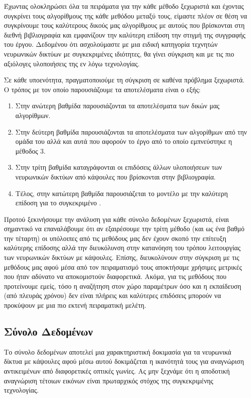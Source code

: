 Έχωντας ολοκληρώσει όλα τα πειράματα για την κάθε μέθοδο ξεχωριστά και έχοντας συγκρίνει τους αλγορίθμους της κάθε μεθόδου μεταξύ τους, είμαστε πλέον σε θέση να συγκρίνουμε τους καλύτερους δικούς μας αλγορίθμους με αυτούς που βρίσκονται στη διεθνή βιβλιογραφία και εμφανίζουν την καλύτερη επίδοση την στιγμή της συγγραφής του έργου. Δεδομένου ότι ασχολούμαστε με μια ειδική κατηγορία τεχνητών νευρωνικών δικτύων με συγκεκριμένες ιδιότητες, θα γίνει σύγκριση και με τις πιο αξιόλογες υλοποιήσεις της εν λόγω τεχνολογίας.\par

Σε κάθε υποενότητα, πραγματοποιούμε τη σύγκριση σε καθένα πρόβλημα ξεχωριστά. Ο τρόπος με τον οποίο παρουσιάζουμε τα αποτελέσματα είναι ο εξής: 
\begin{enumerate}
    \item Στην ανώτερη βαθμίδα παρουσιάζονται τα αποτελέσματα των δικών μας αλγορίθμων.
    \item Στην δεύτερη βαθμίδα παρουσιάζονται τα αποτελέσματα των  αλγορίθμων από την ομάδα του  αλλά και αυτά που αφορούν το έργο \cite{mazzia2021efficient} από το οποίο εμπνεύστηκε η μέθοδος 3.
    \item Στην τρίτη βαθμίδα καταγράφονται οι επιδόσεις άλλων υλοποιήσεων των νευρωνικών δικτύων από κάψουλες που βρίσκονται στην βιβλιογραφία.
    \item Τέλος, στην κατώτερη βαθμίδα παρουσιάζεται το μοντέλο με την καλύτερη επίδοση για το συγκεκριμένο .\par
\end{enumerate}

Προτού ξεκινήσουμε την ανάλυση για κάθε σύνολο δεδομένων ξεχωριστά, είναι σημαντικό να επαναλάβουμε ότι αν εξαιρέσουμε την τρίτη μέθοδο (και ως ένα βαθμό την τέταρτη) οι υπόλοιπες από τις μεθόδους μας δεν έχουν σκοπό την επίτευξη καλύτερης επίδοσης αλλά την διευκόλυνση στην κατανόηση του τρόπου λειτουργίας των νευρωνικών δικτύων με κάψουλες. Επίσης, διευκολύνουν στην σύγκριση με τις μεθόδους μας αφού μέσα από τον πειραματισμό τους αποκτήσαμε χρήσιμες μετρικές που ήταν αδύνατο να αποκομιστούν διαφορετικά. Ακόμα, για τις μεθόδους που προτείνουμε εμείς, τόσο η αναζήτηση στον χώρο παραμέτρων όσο και η εκπαίδευση (από πλευράς χρόνου) δεν είναι πλήρεις και καλύτερες επιδόσεις μπορούν να προκύψουν με μια πιο εκτενή πειραματική μελέτη. \par




\subsection{Σύνολο Δεδομένων }
Το σύνολο δεδομένων  αποτελεί μια χαρακτηριστική δοκιμασία για τα νευρωνικά δίκτυα με κάψουλες αφού μέσω αυτού δοκιμάζεται η ικανότητά τους για αναγνώριση αντικειμένων από διαφορετικές οπτικές γωνίες. Ας μην ξεχνάμε ότι η αποδοτική αναγνώριση τέτοιων εικόνων είναι πρωταρχικός στόχος της συγκεκριμένης τεχνολογίας.\par


